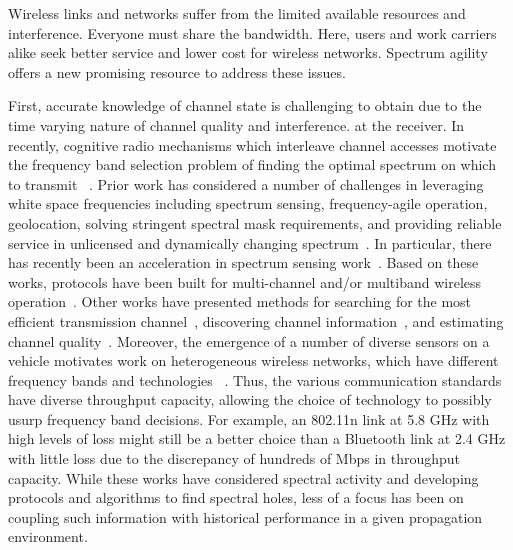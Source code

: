 Wireless links and networks suffer from the limited available resources
and interference. Everyone must 
share the bandwidth. Here, users and work carriers alike seek 
better service and lower cost for wireless networks. 
Spectrum agility offers a new promising resource to address these issues. 

First, accurate knowledge of channel state is challenging to obtain due to the
time varying nature of channel quality and interference.
at the receiver. In recently, cognitive radio mechanisms which 
interleave channel accesses motivate the frequency band selection 
problem of finding the optimal spectrum on which to transmit
~\cite{ghasemi2008spectrum}. Prior work has considered a number of 
challenges in leveraging white space frequencies including spectrum 
sensing, frequency-agile operation, geolocation, solving stringent 
spectral mask requirements, and providing reliable service in unlicensed 
and dynamically changing spectrum~\cite{shellhammer2009technical}. In 
particular, there has recently been an acceleration in spectrum sensing 
work~\cite{rayanchu2011fluid, kim1996pulse,cabric2004implementation}. 
Based on these works, protocols have been built for multi-channel and/or 
multiband wireless operation~\cite{MOAR,raychaudhuri2003spectrum,sabharwal2007opportunistic}. 
Other works have presented methods for searching for the most efficient 
transmission channel~\cite{mo2005comparison}, discovering channel 
information~\cite{rayanchu2011fluid, sabharwal2007opportunistic}, and 
estimating channel quality~\cite{MOAR}. Moreover, the emergence of a 
number of diverse sensors on a vehicle motivates work on heterogeneous 
wireless networks, which have different frequency bands and technologies
~\cite{hossain2010vehicular}. Thus, the various communication standards 
have diverse throughput capacity, allowing the choice of technology 
to possibly usurp frequency band decisions. For example, an 802.11n 
link at 5.8 GHz with high levels of loss might still be a better choice 
than a Bluetooth link at 2.4 GHz with little loss due to the discrepancy 
of hundreds of Mbps in throughput capacity. While these works have 
considered spectral activity and developing protocols and algorithms to 
find spectral holes, less of a focus has been on coupling such information 
with historical performance in a given propagation environment.


